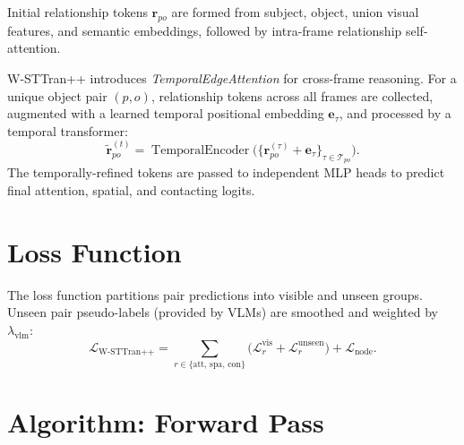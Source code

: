 \documentclass{article}
\newcommand{\op}[1]{\operatorname{#1}}
\newcommand{\mat}[1]{\bm{#1}}
\begin{document}
Initial relationship tokens $\mat{r}_{po}$ are formed from subject, object, union visual features, and semantic embeddings, followed by intra-frame relationship self-attention.

W-STTran++ introduces \emph{TemporalEdgeAttention} for cross-frame reasoning. For a unique object pair $(p, o)$, relationship tokens across all frames are collected, augmented with a learned temporal positional embedding $\mat{e}_\tau$, and processed by a temporal transformer:
\begin{equation}
    \tilde{\mat{r}}_{po}^{(t)} = \op{TemporalEncoder}\bigl(\{{\mat{r}}_{po}^{(\tau)} + \mat{e}_{\tau}\}_{\tau \in \mathcal{T}_{po}}\bigr).
    \label{eq:tea}
\end{equation}
The temporally-refined tokens are passed to independent MLP heads to predict final attention, spatial, and contacting logits.

\section{Loss Function}
\label{sec:loss}

The loss function partitions pair predictions into visible and unseen groups. Unseen pair pseudo-labels (provided by VLMs) are smoothed and weighted by $\lambda_{\text{vlm}}$:
\begin{equation}
    \mathcal{L}_{\text{W-STTran++}} = \sum_{r \in \{\text{att, spa, con}\}} \bigl(\mathcal{L}_{r}^{\text{vis}} + \mathcal{L}_{r}^{\text{unseen}}\bigr) + \mathcal{L}_{\text{node}}.
    \label{eq:loss}
\end{equation}

\section{Algorithm: Forward Pass}
\label{sec:algorithm}
\end{document}
